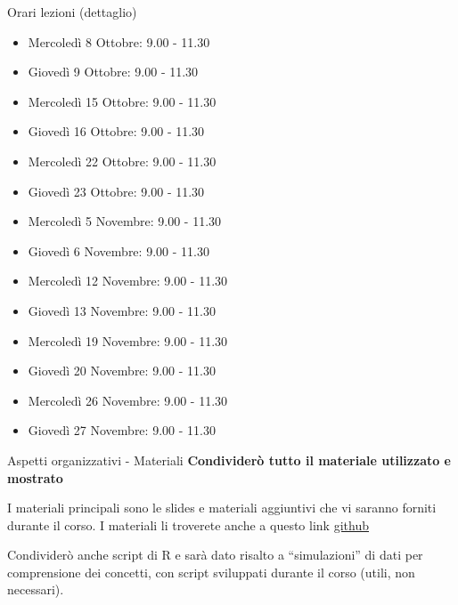 \documentclass[
  ignorenonframetext,
]{beamer}
\providecommand{\tightlist}{%
  \setlength{\itemsep}{0pt}\setlength{\parskip}{0pt}}
\begin{document}
\begin{frame}{Orari lezioni (dettaglio)}
\label{orari-lezioni-dettaglio}
\scriptsize

\begin{itemize}
\tightlist
\item
  Mercoledì 8 Ottobre: 9.00 - 11.30
\item
  Giovedì 9 Ottobre: 9.00 - 11.30
\item
  Mercoledì 15 Ottobre: 9.00 - 11.30
\item
  Giovedì 16 Ottobre: 9.00 - 11.30
\item
  Mercoledì 22 Ottobre: 9.00 - 11.30
\item
  Giovedì 23 Ottobre: 9.00 - 11.30
\item
  Mercoledì 5 Novembre: 9.00 - 11.30
\item
  Giovedì 6 Novembre: 9.00 - 11.30
\item
  Mercoledì 12 Novembre: 9.00 - 11.30
\item
  Giovedì 13 Novembre: 9.00 - 11.30
\item
  Mercoledì 19 Novembre: 9.00 - 11.30
\item
  Giovedì 20 Novembre: 9.00 - 11.30
\item
  Mercoledì 26 Novembre: 9.00 - 11.30
\item
  Giovedì 27 Novembre: 9.00 - 11.30
\end{itemize}
\end{frame}

\begin{frame}{Aspetti organizzativi - Materiali}
\label{aspetti-organizzativi---materiali}
\textbf{Condividerò tutto il materiale utilizzato e mostrato}

I materiali principali sono le slides e materiali aggiuntivi che vi saranno forniti durante il corso. I materiali li troverete anche a questo link \href{https://github.com/giorgioarcara/Slides-Metodi-Statistici-Neuropsi-Forense}{\underline{github}}

Condividerò anche script di R e sarà dato risalto a ``simulazioni'' di
dati per comprensione dei concetti, con script sviluppati durante il
corso (utili, non necessari).
\end{frame}
\end{document}
